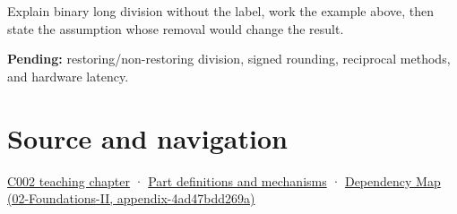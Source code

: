 Explain binary long division without the label, work the example above, then state the assumption whose removal would change the result.

\textbf{Pending:} restoring/non-restoring division, signed rounding, reciprocal methods, and hardware latency.

\section{Source and navigation}\label{appendix-89985e6a2685-source-and-navigation}

\href{Continuous\%20Notes/Computing\%20Foundations\%20-\%20From\%20Bits\%20to\%20C++\%20and\%20Systems\%20APIs\#Arithmetic\%20becomes\%20a\%20policy}{C002 teaching chapter} · \hyperref[appendix-fd090d982a15]{Part definitions and mechanisms} · \href{../02-Foundations-II/main.pdf\#nameddest=appendix-4ad47bdd269a}{Dependency Map (02-Foundations-II, appendix-4ad47bdd269a)}
